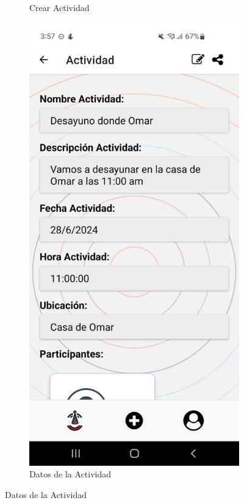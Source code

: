 \begin{figure}[H]
\begin{subfigure}{0.45\textwidth}
        \caption{Crear Actividad}
        \label{fig:img5}
    \end{subfigure}%
    \hfill
    \begin{subfigure}{0.45\textwidth}
        \centering
        \includegraphics[width=\linewidth]{imagenes/Capturas/DatosActividad.jpeg}
        \caption{Datos de la Actividad}
        \label{fig:img6}
    \end{subfigure}
\end{figure}
\vspace*{\fill}

